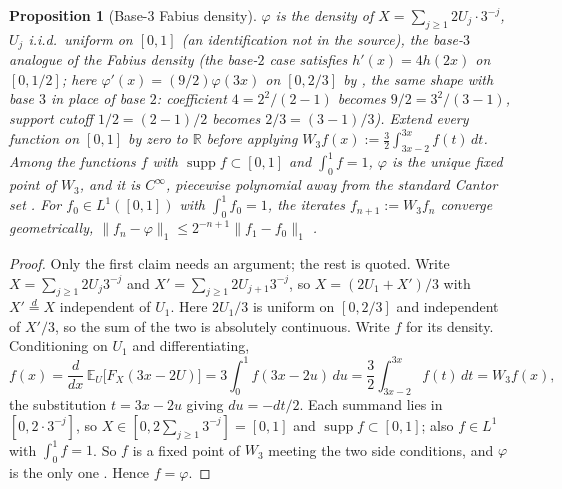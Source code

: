 \documentclass[11pt]{article}
\newtheorem{proposition}[theorem]{Proposition}
\theoremstyle{definition}
\theoremstyle{remark}
\begin{document}
\begin{proposition}[Base-$3$ Fabius density]\label{prop:fabius}
$\varphi$ is the density of $X=\sum_{j\ge1}2U_j\cdot3^{-j}$, $U_j$
i.i.d.\ uniform on $[0,1]$ (an identification not in the source), the
base-$3$ analogue of the Fabius density \cite{Fabius1966} (the
base\nobreakdash-$2$ case satisfies
$h'(x)=4h(2x)$ on $[0,1/2]$; here $\varphi'(x)=
(9/2)\varphi(3x)$ on $[0,2/3]$ by \cite[eq.~(7.7)]{Wirsching2003},
the same shape with base $3$ in place of base $2$: coefficient
$4=2^2/(2-1)$ becomes $9/2=3^2/(3-1)$, support cutoff
$1/2=(2-1)/2$ becomes $2/3=(3-1)/3$).
Extend every function on $[0,1]$ by zero to $\mathbb R$ before applying
$W_3f(x):=\tfrac32\int_{3x-2}^{3x}f(t)\,dt$. Among the functions $f$
with $\operatorname{supp}f\subset[0,1]$ and $\int_0^1f=1$, $\varphi$ is the
unique fixed point of $W_3$, and it is $C^\infty$, piecewise polynomial
away from the standard Cantor set \cite[Corollary~7]{Wirsching2003}.
For $f_0\in L^1([0,1])$ with
$\int_0^1f_0=1$, the
iterates $f_{n+1}:=W_3f_n$ converge geometrically,
$\|f_n-\varphi\|_1\le2^{-n+1}\|f_1-f_0\|_1$
\cite[Corollary~8]{Wirsching2003}.
\end{proposition}

\begin{proof}
Only the first claim needs an argument; the rest is quoted. Write
$X=\sum_{j\ge1}2U_j3^{-j}$ and $X'=\sum_{j\ge1}2U_{j+1}3^{-j}$, so
$X=(2U_1+X')/3$ with $X'\overset{d}{=}X$ independent of $U_1$. Here
$2U_1/3$ is uniform on $[0,2/3]$ and independent of $X'/3$, so the sum
of the two is absolutely continuous. Write $f$ for its density.
Conditioning on $U_1$ and differentiating,
\[
 f(x)=\frac{d}{dx}\,\mathbb{E}_{U}\bigl[F_{X}(3x-2U)\bigr]
     =3\int_0^1f(3x-2u)\,du
     =\frac32\int_{3x-2}^{3x}f(t)\,dt
     =W_3f(x),
\]
the substitution $t=3x-2u$ giving $du=-dt/2$. Each summand lies in
$[0,2\cdot3^{-j}]$, so $X\in[0,2\sum_{j\ge1}3^{-j}]=[0,1]$ and
$\operatorname{supp}f\subset[0,1]$; also $f\in L^1$ with
$\int_0^1f=1$. So $f$ is a fixed point of $W_3$ meeting the two
side conditions, and $\varphi$ is the only one
\cite[Corollary~7]{Wirsching2003}. Hence $f=\varphi$.
\end{proof}
\end{document}
